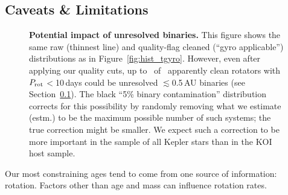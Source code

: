 \documentclass[11pt,twocolumn,tighten]{aastex63}
\begin{document}
\subsection{Caveats \& Limitations}
\label{subsec:caveats}


\begin{figure}[!t]
	\begin{center}
		\leavevmode
	\end{center}
	\vspace{-0.6cm}
	\caption{{\bf Potential impact of unresolved binaries.}   This figure shows
		the same raw (thinnest line) and quality-flag cleaned (``gyro applicable'') distributions
		as in Figure~\ref{fig:hist_tgyro}.
		However, even after applying our quality cuts, up to
		\fivepctnuniqstarsantosrotgyroappl\ of \ngyroappllttendays\ apparently clean rotators with
		$P_{\rm rot}$$<$10\,days could be unresolved $\lesssim$0.5\,AU  binaries (see Section~\ref{subsec:caveats}).
		The black ``5\% binary contamination'' distribution corrects for this possibility by randomly removing
		what we estimate (estm.) to be the maximum possible number of such systems; the true
		correction might be smaller.  We expect such a correction to be more important in
		the sample of all Kepler stars than in the KOI host sample.
		\label{fig:hist_tgyro_corr}
	}
\end{figure}

Our most constraining ages tend to come from one source of
information: rotation.  Factors other than age and mass can
influence rotation rates.  
\end{document}
